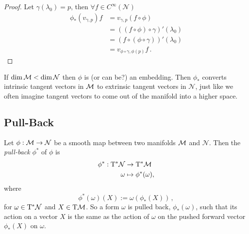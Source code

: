 \documentclass[11pt, a4paper, twocolumn]{article} %
\begin{document}
\begin{proof}
    Let $\gamma(\lambda_0) = p$, then $\forall f\in C^\infty(\mathcal{N})$
    \begin{align}
        \nonumber \phi_*(v_{\gamma,p})f &= v_{\gamma, p}(f\circ \phi)\\
        \nonumber &= \left( (f\circ\phi)\circ\gamma \right)'(\lambda_0)\\
        \nonumber &= \left( f\circ(\phi\circ\gamma) \right)'(\lambda_0)\\
        &= v_{\phi\circ\gamma,\phi(p)}f\,.
    \end{align}
\end{proof}
\begin{note}
    If $\dim\mathcal{M} < \dim\mathcal{N}$ then $\phi$ is (or can be?) an embedding.
    Then $\phi_*$ converts intrinsic tangent vectors in $\mathcal{M}$ to extrinsic
    tangent vectors in $\mathcal{N}$, just like we often imagine tangent vectors
    to come out of the manifold into a higher space.
\end{note}

\subsection{Pull-Back}
\begin{defn}
    Let $\phi: \mathcal{M}\to\mathcal{N}$ be a smooth map between two manifolds
    $\mathcal{M}$ and $\mathcal{N}$.
    Then the \textit{pull-back} $\phi^*$ of $\phi$ is
    \begin{align}
        \phi^*: \T^*\mathcal{N} &\to \T^*\M\\
        \omega &\mapsto \phi^*(\omega),
    \end{align}
    where 
    \begin{equation}
        \phi^*(\omega)(X) := \omega\left( \phi_*(X) \right)\,,
    \end{equation}
    for $\omega\in\T^*\mathcal{N}$ and $X\in\T\M$.
    So a form $\omega$ is pulled back, $\phi_*(\omega)$, such that its action on
    a vector $X$ is the same as the action of $\omega$ on the pushed forward
    vector $\phi_*(X)$ on $\omega$.
    \begin{center}
    \end{center}
\end{defn}
\end{document}
